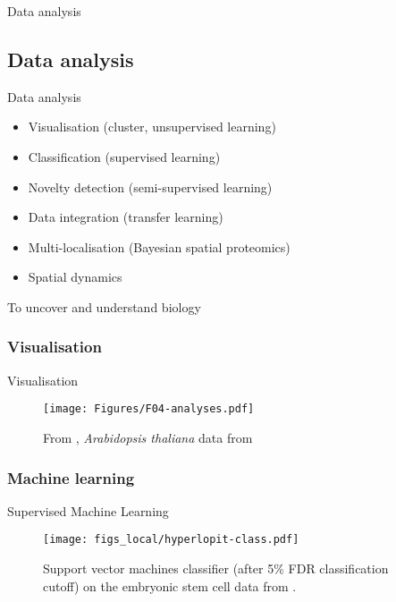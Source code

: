 \begin{frame}{}
  \begin{center}
    \Large{Data analysis}
  \end{center}
\end{frame}


\subsection*{Data analysis}
\label{sec:comp}


\begin{frame}{Data analysis}
  \begin{itemize}
  \item Visualisation (cluster, unsupervised learning)
  \item Classification (supervised learning)
  \item Novelty detection (semi-supervised learning)
  \item Data integration (transfer learning)
  \item Multi-localisation (Bayesian spatial proteomics)
  \item Spatial dynamics
  \end{itemize}
  \centering
  {\Large To uncover and understand biology}
\end{frame}



\subsubsection*{Visualisation}
\label{sec:viz}

\begin{frame}{Visualisation}
  \begin{figure}
    \centering
    \texttt{[image: Figures/F04-analyses.pdf]}
    \caption{From \cite{Gatto:2010}, \textit{Arabidopsis thaliana} data
      from \cite{Dunkley:2006}}
  \end{figure}
\end{frame}

\subsubsection*{Machine learning}
\label{sec:ml}

\begin{frame}{Supervised Machine Learning}
  \begin{figure}[h]
    \centering
    \texttt{[image: figs\_local/hyperlopit-class.pdf]}
    \caption{Support vector machines classifier (after 5\% FDR
      classification cutoff) on the embryonic stem cell data from
      \cite{Christoforou:2016}.}
  \end{figure}
\end{frame}

